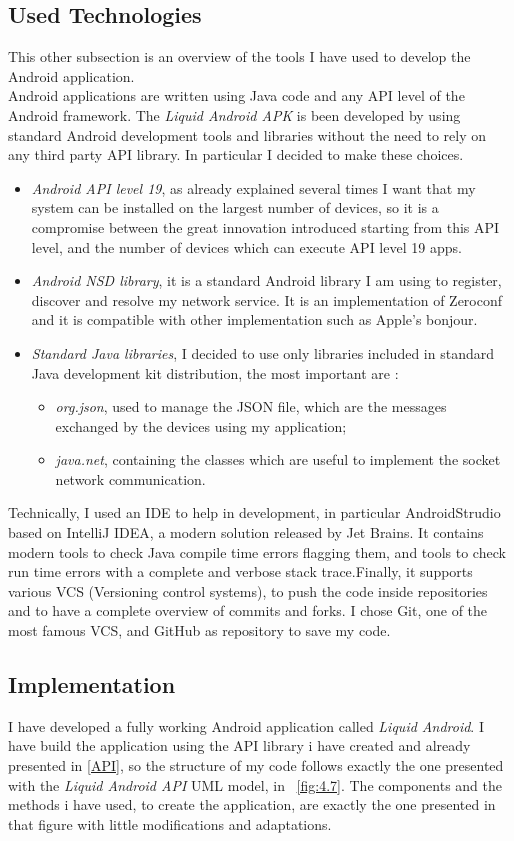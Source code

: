 \subsection{Used Technologies}
This other subsection is an overview of the tools I have used to develop the
Android application.\\
Android applications are written using Java code and any API level of the Android framework. The \textit{Liquid Android APK} is been developed by using standard Android development tools and libraries without the need to rely on any third party API library. In particular I decided to make these choices.
\begin{itemize}
	\item \textit{Android API level 19}, as already explained several times I want that my system can be installed on the largest number of devices, so it is a compromise between the great innovation introduced starting from this API level, and the number of devices which can execute API level 19 apps.
	\item \textit{Android NSD library}, it is a standard Android library I am using to register, discover and resolve my network service. It is an implementation of Zeroconf and it is compatible with other implementation such as Apple's bonjour.
	\item \textit{Standard Java libraries}, I decided to use only libraries included in standard Java development kit distribution, the most important are :
	\begin{itemize}
		\item \textit{org.json}, used to manage the JSON file, which are the messages exchanged by the devices using my application;
		\item \textit{java.net}, containing the classes which are useful to implement the socket network communication.
	\end{itemize}	
\end{itemize}
Technically, I used an IDE to help in development, in particular AndroidStrudio based on IntelliJ IDEA, a
modern solution released by Jet Brains. It contains modern tools to check Java
compile time errors flagging them, and tools to check run time errors with a
complete and verbose stack trace.Finally,
it supports various VCS (Versioning control systems), to push the code inside
repositories and to have a complete overview of commits and forks. I chose Git,
one of the most famous VCS, and GitHub as repository to save my code.
\subsection{Implementation}
I have developed a fully working Android application called \textit{Liquid Android}. I have build the application using the API library i have created and already presented in \ref{API}, so the structure of my code follows exactly the one presented with the \textit{Liquid Android API} UML model, in \figurename~\ref{fig:4.7}. The components and the methods i have used, to create the application, are exactly the one presented in that figure with little modifications and adaptations.
